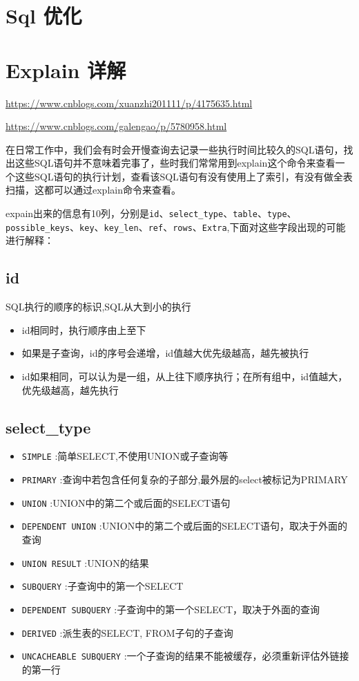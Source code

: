 \documentclass[UTF8,a4paper,12pt]{ctexbook}
\begin{document}
	\section{Sql 优化}	
		
		
	\section{Explain 详解}
		\url{https://www.cnblogs.com/xuanzhi201111/p/4175635.html}
		
		\url{https://www.cnblogs.com/galengao/p/5780958.html}
		
		在日常工作中，我们会有时会开慢查询去记录一些执行时间比较久的SQL语句，找出这些SQL语句并不意味着完事了，些时我们常常用到explain这个命令来查看一个这些SQL语句的执行计划，查看该SQL语句有没有使用上了索引，有没有做全表扫描，这都可以通过explain命令来查看。
		
		expain出来的信息有10列，分别是\verb|id|、\verb|select_type|、\verb|table|、\verb|type|、\verb|possible_keys|、\verb|key|、\verb|key_len|、\verb|ref|、\verb|rows|、\verb|Extra|,下面对这些字段出现的可能进行解释：
		
		\subsection{id}
			SQL执行的顺序的标识,SQL从大到小的执行
			\begin{itemize}
				\item id相同时，执行顺序由上至下
				\item 如果是子查询，id的序号会递增，id值越大优先级越高，越先被执行
				\item id如果相同，可以认为是一组，从上往下顺序执行；在所有组中，id值越大，优先级越高，越先执行
			\end{itemize}
			
		\subsection{select\_type}
			\begin{itemize}
				\item \verb|SIMPLE|  :简单SELECT,不使用UNION或子查询等
				\item \verb|PRIMARY| :查询中若包含任何复杂的子部分,最外层的select被标记为PRIMARY
				\item \verb|UNION| :UNION中的第二个或后面的SELECT语句
				\item \verb|DEPENDENT UNION| :UNION中的第二个或后面的SELECT语句，取决于外面的查询
				\item \verb|UNION RESULT| :UNION的结果
				\item \verb|SUBQUERY| :子查询中的第一个SELECT
				\item \verb|DEPENDENT SUBQUERY| :子查询中的第一个SELECT，取决于外面的查询
				\item \verb|DERIVED| :派生表的SELECT, FROM子句的子查询
				\item \verb|UNCACHEABLE SUBQUERY| :一个子查询的结果不能被缓存，必须重新评估外链接的第一行
			\end{itemize}
			
\end{document}
